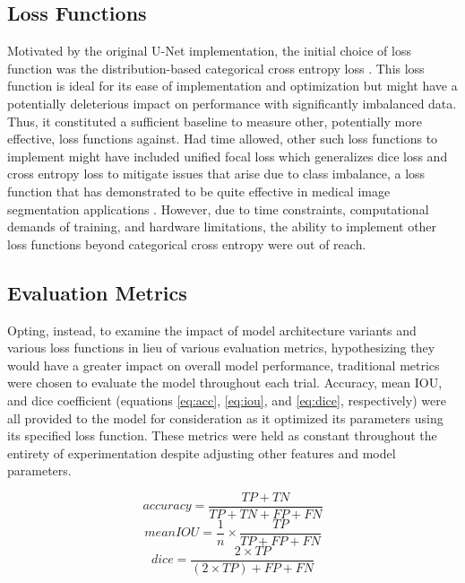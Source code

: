 \documentclass{article}
\begin{document}
\begin{multicols}{2}
\subsection{Loss Functions}
	
Motivated by the original U-Net implementation, the initial choice of loss function was the distribution-based categorical cross entropy loss \cite{unet_ronneberger2015}. This loss function is ideal for its ease of implementation and optimization but might have a potentially deleterious impact on performance with significantly imbalanced data. Thus, it constituted a sufficient baseline to measure other, potentially more effective, loss functions against. Had time allowed, other such loss functions to implement might have included unified focal loss which generalizes dice loss and cross entropy loss to mitigate issues that arise due to class imbalance, a loss function that has demonstrated to be quite effective in medical image segmentation applications \cite{unifiedLoss_yeung2022}. However, due to time constraints, computational demands of training, and hardware limitations, the ability to implement other loss functions beyond categorical cross entropy were out of reach.

\subsection{Evaluation Metrics}
	
Opting, instead, to examine the impact of model architecture variants and various loss functions in lieu of various evaluation metrics, hypothesizing they would have a greater impact on overall model performance, traditional metrics were chosen to evaluate the model throughout each trial. Accuracy, mean IOU, and dice coefficient (equations \ref{eq:acc}, \ref{eq:iou}, and \ref{eq:dice}, respectively) were all provided to the model for consideration as it optimized its parameters using its specified loss function. These metrics were held as constant throughout the entirety of experimentation despite adjusting other features and model parameters.

\begin{equation}
accuracy=\frac{TP+TN}{TP+TN+FP+FN}
\label{eq:acc}
\end{equation}
\begin{equation}
meanIOU=\frac{1}{n}\times\frac{TP}{TP+FP+FN}
\label{eq:iou}
\end{equation}
\begin{equation}
dice=\frac{2\times TP}{(2\times TP)+FP+FN}
\label{eq:dice}
\end{equation}


\end{multicols}
\end{document}
